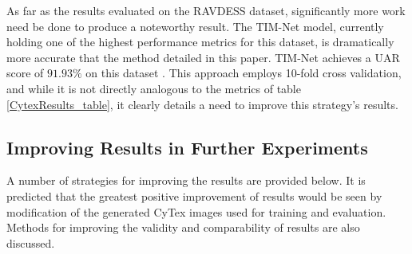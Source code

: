 As far as the results evaluated on the RAVDESS dataset, significantly more work need be done to produce a noteworthy result. The TIM-Net model, currently holding one of the highest performance metrics for this dataset, is dramatically more accurate that the method detailed in this paper. TIM-Net achieves a UAR score of $91.93\%$ on this dataset \cite{ye2023temporal}. This approach employs 10-fold cross validation, and while it is not directly analogous to the metrics of table \ref{CytexResults_table}, it clearly details a need to improve this strategy's results.


\subsection{Improving Results in Further Experiments}
A number of strategies for improving the results are provided below. It is predicted that the greatest positive improvement of results would be seen by modification of the generated CyTex images used for training and evaluation. Methods for improving the validity and comparability of results are also discussed.
